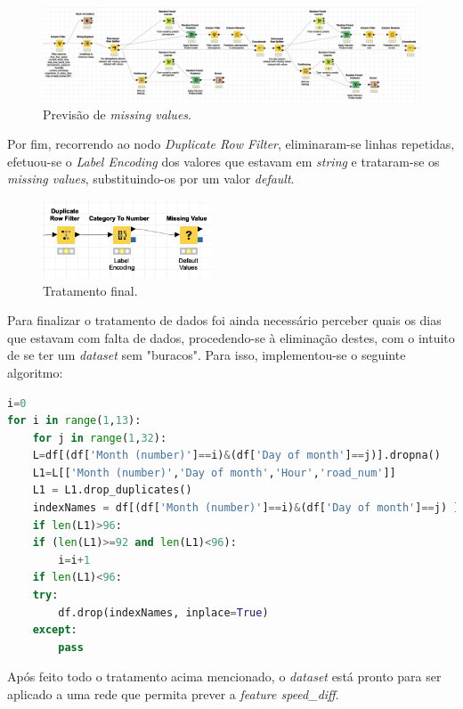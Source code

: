 \documentclass[a4paper, 12pt]{article}
\begin{document}
\begin{figure}[H]
	\centering
	\includegraphics[width=15cm]{final}
	\caption{Previsão de \textit{missing values}.}
\end{figure}

Por fim, recorrendo ao nodo \textit{Duplicate Row Filter}, eliminaram-se linhas repetidas, efetuou-se o \textit{Label Encoding} dos valores que estavam em \textit{string} e trataram-se os \textit{missing values}, substituindo-os por um valor \textit{default}.

\begin{figure}[H]
	\centering
	\includegraphics[width=5cm]{fim}
	\caption{Tratamento final.}
\end{figure}

Para finalizar o tratamento de dados foi ainda necessário perceber quais os dias que estavam com falta de dados, procedendo-se à eliminação destes, com o intuito de se ter um \textit{dataset} sem "buracos". Para isso, implementou-se o seguinte algoritmo:

\begin{lstlisting}[language=Python]
i=0
for i in range(1,13):
	for j in range(1,32):
	L=df[(df['Month (number)']==i)&(df['Day of month']==j)].dropna()
	L1=L[['Month (number)','Day of month','Hour','road_num']]
	L1 = L1.drop_duplicates()
	indexNames = df[(df['Month (number)']==i)&(df['Day of month']==j) ].index
	if len(L1)>96:
	if (len(L1)>=92 and len(L1)<96):
		i=i+1
	if len(L1)<96:
	try:
		df.drop(indexNames, inplace=True)
	except:
		pass
\end{lstlisting}

Após feito todo o tratamento acima mencionado, o \textit{dataset} está pronto para ser aplicado a uma rede que permita prever a \textit{feature speed\_diff}.
\end{document}
